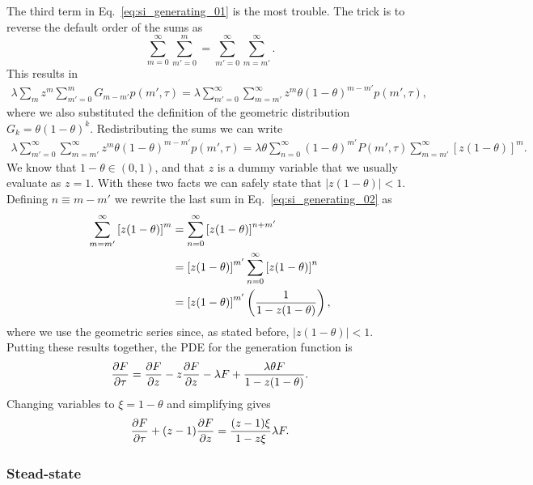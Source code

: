 The third term in Eq.~\ref{eq:si_generating_01} is the most trouble. The trick
is to reverse the default order of the sums as
\begin{equation}
\sum_{m=0}^{\infty} \sum_{m'=0}^{m} = \sum_{m'=0}^{\infty} \sum_{m=m'}^{\infty}.
\end{equation}
This results in
\begin{align}
\lambda \sum_m z^m \sum_{m'=0}^m G_{m-m'} p(m', \tau) =
\lambda \sum_{m'=0}^{\infty} \sum_{m=m'}^{\infty} z^m 
\theta (1 - \theta)^{m-m'} p(m', \tau),
\end{align}
where we also substituted the definition of the geometric distribution $G_{k} =
\theta (1 - \theta)^k$. Redistributing the sums we can write
\begin{align}
\lambda \sum_{m'=0}^{\infty} \sum_{m=m'}^{\infty} z^m 
\theta (1 - \theta)^{m-m'} p(m', \tau) = 
\lambda \theta \sum_{n=0}^{\infty}(1-\theta)^{m'} P(m', \tau) 
\sum_{m=m'}^{\infty} \left[z (1-\theta)\right]^{m}.
\label{eq:si_generating_02}
\end{align}
We know that $1 - \theta \in (0, 1)$, and that $z$ is a dummy variable that we
usually evaluate as $z=1$. With these two facts we can safely state that
$| z (1 - \theta) | < 1$. Defining $n \equiv m - m'$ we rewrite the last sum in 
Eq.~\ref{eq:si_generating_02} as
\begin{align}
\sum_{m=m'}^{\infty} \left[z (1-\theta)\right]^{m} &= 
\sum_{n=0}^{\infty} \left[z (1-\theta)\right]^{n + m'} \\
&= \left[ z (1 - \theta) \right]^{m'} 
\sum_{n=0}^{\infty} \left[ z (1 - \theta) \right]^{n} \\
&= \left[ z (1 - \theta) \right]^{m'} 
\left( {1 \over 1 - z (1 - \theta)} \right),
\end{align}
where we use the geometric series since, as stated before, $| z (1 - \theta) | <
1$. Putting these results together, the PDE for the generation function is
\begin{equation}
{\partial F \over \partial \tau} = 
{\partial F \over\partial z}
- z {\partial F \over \partial z} - \lambda F
+ \frac{\lambda\theta F}{1-z(1-\theta)}.
\end{equation}
Changing variables to $\xi=1-\theta$ and simplifying gives
\begin{align}
{\partial F \over \partial \tau} + (z - 1) {\partial F \over \partial z} = 
\frac{(z-1)\xi}{1-z\xi}\lambda F.
\label{eq:1state_unreg_015}
\end{align}

\subsubsection{Stead-state}

